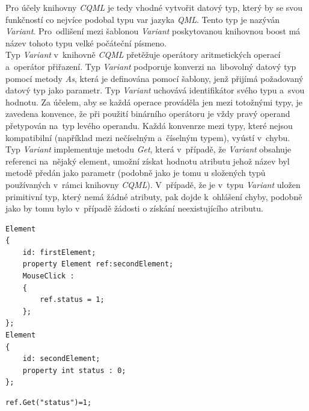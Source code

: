 \documentclass[11pt,twoside,a4paper]{book}
\begin{document}
Pro účely knihovny \textit{CQML} je tedy vhodné vytvořit datový typ, který by se svou funkčností co nejvíce podobal typu var jazyka \textit{QML}. Tento typ je nazýván \textit{Variant}. Pro~odlišení mezi šablonou \textit{Variant} poskytovanou knihovnou boost má název tohoto typu velké počáteční písmeno.\\
Typ \textit{Variant} v~knihovně \textit{CQML} přetěžuje operátory aritmetických operací a~operátor přiřazení. Typ \textit{Variant} podporuje konverzi na~libovolný datový typ pomocí metody \textit{As}, která je definována pomocí šablony, jenž přijímá požadovaný datový typ jako parametr. Typ \textit{Variant} uchovává identifikátor svého typu a~svou hodnotu. Za účelem, aby se každá operace prováděla jen mezi totožnými typy, je zavedena konvence, že při použití binárního operátoru je vždy pravý operand přetypován na~typ levého operandu. Každá konvenrze mezi typy, které nejsou kompatibilní (například mezi nečíselným a~číselným typem), vyústí v~chybu.\\
Typ \textit{Variant} implementuje metodu \textit{Get}, která v~případě, že \textit{Variant} obsahuje referenci na~nějaký element, umožní získat hodnotu atributu jehož název byl metodě předán jako parametr (podobně jako je tomu u složených typů používaných v~rámci knihovny \textit{CQML}). V~případě, že je v~typu \textit{Variant} uložen primitivní typ, který nemá žádné atributy, pak dojde k~ohlášení chyby, podobně jako by tomu bylo v~případě žádosti o získání neexistujícího atributu.
\begin{lstlisting}[float,frame=single,caption=\textit{CQML} kód měnící hodnotu atributu elementu\, prostřednictvím reference na~daný element.,label=lst:var0N]
Element
{
	id: firstElement;
	property Element ref:secondElement;
	MouseClick :
	{
		ref.status = 1;
	};
};
Element
{
	id: secondElement;
	property int status : 0;
};
\end{lstlisting}
\begin{lstlisting}[frame=single,caption={Přeložený kód funkce, který ilustruje nutnost vrácení reference metodou \textit{Get}.},label=lst:var00N]
ref.Get("status")=1;
\end{lstlisting}
\end{document}
